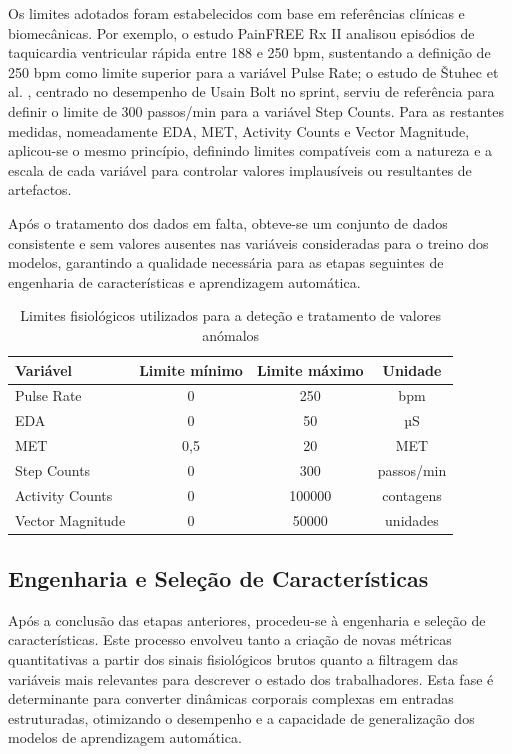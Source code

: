 Os limites adotados foram estabelecidos com base em referências clínicas e biomecânicas. Por exemplo, o estudo PainFREE Rx II \cite{wathen2004} analisou episódios de taquicardia ventricular rápida entre 188 e 250 bpm, sustentando a definição de 250 bpm como limite superior para a variável Pulse Rate; o estudo de Štuhec et al. \cite{stuhec2023}, centrado no desempenho de Usain Bolt no sprint, serviu de referência para definir o limite de 300 passos/min para a variável Step Counts. Para as restantes medidas, nomeadamente EDA, MET, Activity Counts e Vector Magnitude, aplicou-se o mesmo princípio, definindo limites compatíveis com a natureza e a escala de cada variável para controlar valores implausíveis ou resultantes de artefactos.

Após o tratamento dos dados em falta, obteve-se um conjunto de dados consistente e sem valores ausentes nas variáveis consideradas para o treino dos modelos, garantindo a qualidade necessária para as etapas seguintes de engenharia de características e aprendizagem automática.

\begin{table}[H]
\centering
\caption{Limites fisiológicos utilizados para a deteção e tratamento de valores anómalos}
\label{tab:limites_fisiologicos}
\begin{tabular}{@{}lccc@{}}
\toprule
Variável & Limite mínimo & Limite máximo & Unidade \\
\midrule
Pulse Rate & 0 & 250 & bpm \\
EDA & 0 & 50 & µS \\
MET & 0,5 & 20 & MET \\
Step Counts & 0 & 300 & passos/min \\
Activity Counts & 0 & 100000 & contagens \\
Vector Magnitude & 0 & 50000 & unidades \\
\bottomrule
\end{tabular}
\end{table}

\subsection{Engenharia e Seleção de Características}

Após a conclusão das etapas anteriores, procedeu-se à engenharia e seleção de características. Este processo envolveu tanto a criação de novas métricas quantitativas a partir dos sinais fisiológicos brutos quanto a filtragem das variáveis mais relevantes para descrever o estado dos trabalhadores. Esta fase é determinante para converter dinâmicas corporais complexas em entradas estruturadas, otimizando o desempenho e a capacidade de generalização dos modelos de aprendizagem automática.

